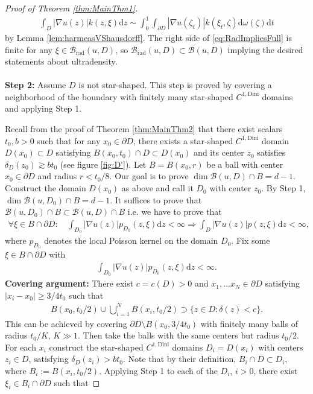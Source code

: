 \documentclass[a4paper,12pt]{article}
\theoremstyle{definition}
\theoremstyle{definition}
\begin{document}
\begin{proof}[Proof of Theorem \ref{thm:MainThm1}]
\begin{align}
				\int_{D}|\nabla u(z)|k(z,\xi)\mathrm{d}z\sim \int_0^{1}\int_{\partial D}|\nabla u(\zeta_t)|k(\xi_t,\zeta)\mathrm{d}\omega(\zeta)\mathrm{d}t
		\end{align}
		by Lemma \ref{lem:harmeasVShausdorff}. The right side of \eqref{eq:RadImpliesFull} is finite for any $\xi\in\mathcal B_{\mathrm{rad}}(u,D)$, so $\mathcal B_{\mathrm{rad}}(u,D)\subset \mathcal B(u, D)$ implying the desired statements about ultradensity.\\\\
		\textbf{Step 2:} Assume $D$ is not star-shaped. This step is proved by covering a neighborhood of the boundary with finitely many star-shaped $C^{1,\mathrm{Dini}}$ domains and applying Step 1. \par 
		Recall from the proof of Theorem \ref{thm:MainThm2} that there exist scalars $t_0,b>0$ such that for any $x_0\in\partial D$, there exists a star-shaped $C^{1,\mathrm{Dini}}$ domain $D(x_0)\subset D$ satisfying $B(x_0,t_0)\cap D\subset D(x_0)$ and its center $z_0$ satisfies $\delta_D(z_0)\gtrsim bt_0$ (see figure \ref{fig:D'}). Let $B=B(x_0,r)$ be a ball with center $x_0\in\partial D$ and radius $r<t_0/8$. Our goal is to prove $\dim\mathcal B(u,D)\cap B=d-1$. Construct the domain $D(x_0)$ as above and call it $D_0$ with center $z_0$. By Step 1, $\dim \mathcal B(u,D_0)\cap B=d-1$. It suffices to prove that $\mathcal B(u,D_0)\cap B\subset \mathcal B(u, D)\cap B$ i.e. we have to prove that
		\begin{align}
			\forall \xi\in B\cap\partial D:\quad\int_{D_0}|\nabla u(z)| p_{D_0}(z,\xi)\mathrm dz<\infty\Rightarrow\int_{D}|\nabla u(z)|p(z,\xi)\mathrm dz<\infty,
		\end{align}
		where $p_{D_0}$ denotes the local Poisson kernel on the domain $D_0$. Fix some $\xi\in B\cap\partial D$ with
		\begin{align*}
			\int_{D_0}|\nabla u(z)| p_{D_0}(z,\xi)\mathrm dz<\infty.
		\end{align*}
		\textbf{Covering argument: }There exist $c=c(D)>0$ and $x_1,\dots x_N\in\partial D$ satisfying $|x_i-x_0|\geq3/4t_0$ such that
		\begin{align}
			B(x_0,t_0/2)\cup\bigcup_{i=1}^N B(x_i,t_0/2)\supset \lbrace z\in D:\delta(z)<c\rbrace.
		\end{align}
		This can be achieved by covering $\partial D\setminus B(x_0,3/4t_0)$ with finitely many balls of radius $t_0/K$, $K\gg1$. Then take the balls with the same centers but radius $t_0/2$. For each $x_i$ construct the star-shaped $C^{1,\mathrm{Dini}}$ domains $D_i=D(x_i)$ with centers $z_i\in D$, satisfying $\delta_D(z_i)>bt_0$. Note that by their definition, $B_i\cap D\subset D_i$, where $B_i:=B(x_i,t_0/2)$. Applying Step 1 to each of the $D_i$, $i>0$, there exist $\xi_i\in B_i\cap\partial D$ such that

\end{proof}
\end{document}
